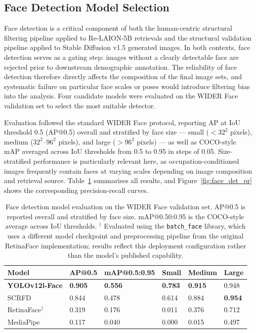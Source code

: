 \subsection{Face Detection Model Selection}
\label{subsec:face_detection_selection}

Face detection is a critical component of both the human-centric structural 
filtering pipeline applied to Re-LAION-5B retrievals and the structural 
validation pipeline applied to Stable Diffusion v1.5 generated images. In 
both contexts, face detection serves as a gating step: images without a 
clearly detectable face are rejected prior to downstream demographic 
annotation. The reliability of face detection therefore directly affects 
the composition of the final image sets, and systematic failure on 
particular face scales or poses would introduce filtering bias into the 
analysis. Four candidate models were evaluated on the WIDER Face validation 
set \cite{Yang_2016_WIDERFace} to select the most suitable detector.

Evaluation followed the standard WIDER Face protocol, reporting AP at 
IoU threshold 0.5 (AP@0.5) overall and stratified by face size — small 
($< 32^2$ pixels), medium ($32^2$--$96^2$ pixels), and large ($> 96^2$ 
pixels) — as well as COCO-style mAP averaged across IoU thresholds from 
0.5 to 0.95 in steps of 0.05. Size-stratified performance is particularly 
relevant here, as occupation-conditioned images frequently contain faces 
at varying scales depending on image composition and retrieval source. 
Table~\ref{tab:face_det_eval} summarises all results, and 
Figure~\ref{fig:face_det_pr} shows the corresponding precision-recall 
curves.

\begin{table}[ht]
	\centering
	\caption{Face detection model evaluation on the WIDER Face validation 
		set. AP@0.5 is reported overall and stratified by face size. 
		mAP@0.50:0.95 is the COCO-style average across IoU thresholds.
		$^\dagger$ Evaluated using the \texttt{batch\_face} library, which 
		uses a different model checkpoint and preprocessing pipeline from 
		the original RetinaFace implementation; results reflect this 
		deployment configuration rather than the model's published 
		capability.}
	\label{tab:face_det_eval}
	\begin{tabular}{llllll}
		\hline
		\textbf{Model} & \textbf{AP@0.5} & \textbf{mAP@0.5:0.95} & 
		\textbf{Small} & \textbf{Medium} & \textbf{Large} \\
		\hline
		\textbf{YOLOv12l-Face} & \textbf{0.905} & \textbf{0.556} & 
		\textbf{0.783} & \textbf{0.915} & 0.948 \\
		SCRFD                  & 0.844 & 0.478 & 0.614 & 0.884 & \textbf{0.954} \\
		RetinaFace$^\dagger$   & 0.319 & 0.176 & 0.011 & 0.376 & 0.712 \\
		MediaPipe              & 0.117 & 0.040 & 0.000 & 0.015 & 0.497 \\
		\hline
	\end{tabular}
\end{table}

